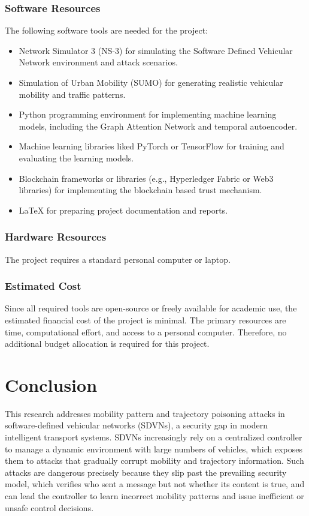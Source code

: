 \documentclass[12pt, a4paper]{report}
\begin{document}
\subsection{Software Resources}
The following software tools are needed for the project:
\begin{itemize}
	\item Network Simulator 3 (NS-3) for simulating the Software Defined Vehicular Network environment and attack scenarios.
	\item Simulation of Urban Mobility (SUMO) for generating realistic vehicular mobility and traffic patterns.
	\item Python programming environment for implementing machine learning models, including the Graph Attention Network and temporal autoencoder.
	\item Machine learning libraries liked PyTorch or TensorFlow for training and evaluating the learning models.
	\item Blockchain frameworks or libraries (e.g., Hyperledger Fabric or Web3 libraries) for implementing the blockchain based trust mechanism.
	\item LaTeX for preparing project documentation and reports.
\end{itemize}

\subsection{Hardware Resources}
The project requires a standard personal computer or laptop.

\subsection{Estimated Cost}
Since all required tools are open-source or freely available for academic use, the estimated financial cost of the project is minimal. The primary resources are time, computational effort, and access to a personal computer. Therefore, no additional budget allocation is required for this project.


\chapter{Conclusion}

This research addresses mobility pattern and trajectory poisoning attacks in software-defined vehicular networks (SDVNs), a security gap in modern intelligent transport systems. SDVNs increasingly rely on a centralized controller to manage a dynamic environment with large numbers of vehicles, which exposes them to attacks that gradually corrupt mobility and trajectory information. Such attacks are dangerous precisely because they slip past the prevailing security model, which verifies who sent a message but not whether its content is true, and can lead the controller to learn incorrect mobility patterns and issue inefficient or unsafe control decisions.
\end{document}
